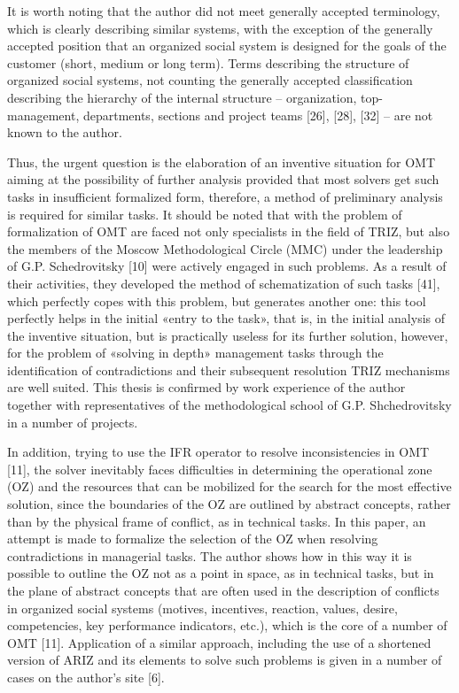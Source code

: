 \documentclass[11pt,a4paper]{book}
\begin{document}
It is worth noting that the author did not meet generally accepted
terminology, which is clearly describing similar systems, with the exception
of the generally accepted position that an organized social system is designed
for the goals of the customer (short, medium or long term). Terms describing
the structure of organized social systems, not counting the generally accepted
classification describing the hierarchy of the internal structure --
organization, top-management, departments, sections and project teams [26],
[28], [32] -- are not known to the author.

Thus, the urgent question is the elaboration of an inventive situation for OMT
aiming at the possibility of further analysis provided that most solvers get
such tasks in insufficient formalized form, therefore, a method of preliminary
analysis is required for similar tasks. It should be noted that with the
problem of formalization of OMT are faced not only specialists in the field of
TRIZ, but also the members of the Moscow Methodological Circle (MMC) under the
leadership of G.P. Schedrovitsky [10] were actively engaged in such problems.
As a result of their activities, they developed the method of schematization
of such tasks [41], which perfectly copes with this problem, but generates
another one: this tool perfectly helps in the initial «entry to the task»,
that is, in the initial analysis of the inventive situation, but is
practically useless for its further solution, however, for the problem of
«solving in depth» management tasks through the identification of
contradictions and their subsequent resolution TRIZ mechanisms are well
suited. This thesis is confirmed by work experience of the author together
with representatives of the methodological school of G.P. Shchedrovitsky in a
number of projects.

In addition, trying to use the IFR operator to resolve inconsistencies in OMT
[11], the solver inevitably faces difficulties in determining the operational
zone (OZ) and the resources that can be mobilized for the search for the most
effective solution, since the boundaries of the OZ are outlined by abstract
concepts, rather than by the physical frame of conflict, as in technical
tasks. In this paper, an attempt is made to formalize the selection of the OZ
when resolving contradictions in managerial tasks.  The author shows how in
this way it is possible to outline the OZ not as a point in space, as in
technical tasks, but in the plane of abstract concepts that are often used in
the description of conflicts in organized social systems (motives, incentives,
reaction, values, desire, competencies, key performance indicators, etc.),
which is the core of a number of OMT [11]. Application of a similar approach,
including the use of a shortened version of ARIZ and its elements to solve
such problems is given in a number of cases on the author’s site [6].
\end{document}
